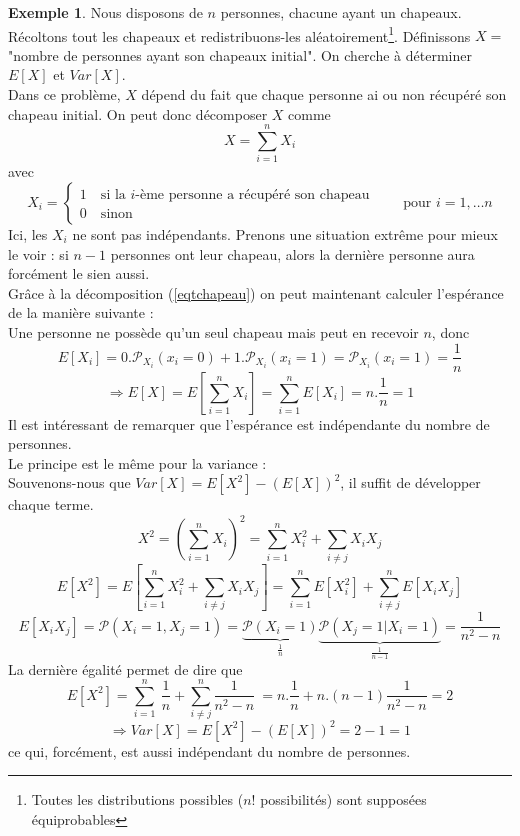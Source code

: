 \documentclass[a4paper,12pt]{report}
\theoremstyle{definition}
\renewcommand{\(}{\left(}
\renewcommand{\)}{\right)}
\renewcommand{\P}{\mathcal{P}}
\renewcommand{\t}{\text}
\newtheorem{exmp}[thm]{Exemple}
\begin{document}
            \begin{exmp}
                Nous disposons de $n$ personnes, chacune ayant un chapeaux. Récoltons tout les chapeaux et redistribuons-les aléatoirement\footnote{Toutes les distributions possibles ($n!$ possibilités) sont supposées équiprobables}. Définissons $X=$"nombre de personnes ayant son chapeaux initial". On cherche à déterminer $E[X]$ et $Var[X]$.\\
        
                Dans ce problème, $X$ dépend du fait que chaque personne ai ou non récupéré son chapeau initial. On peut donc décomposer $X$ comme
                \begin{equation}
                    X=\sum_{i=1}^n X_i
                    \label{eqtchapeau}
                \end{equation}
                avec
                $$X_i = \begin{cases}
                1 \quad \t{si la $i$-ème personne a récupéré son chapeau}\\
                0 \quad \t{sinon}
                \end{cases}\qquad \t{pour } i=1,\dots n$$
                Ici, les $X_i$ ne sont pas indépendants. Prenons une situation extrême pour mieux le voir : si $n-1$ personnes ont leur chapeau, alors la dernière personne aura forcément le sien aussi.\\
        
                Grâce à la décomposition (\ref{eqtchapeau}) on peut maintenant calculer l'espérance de la manière suivante :\\
                Une personne ne possède qu'un seul chapeau mais peut en recevoir $n$, donc
                $$E[X_i] = 0.\P_{X_i}(x_i=0)+1.\P_{X_i}(x_i=1) = \P_{X_i}(x_i=1) = \frac{1}{n}$$
                $$\Rightarrow E[X] =E\left[ \sum_{i=1}^n X_i\right] = \sum_{i=1}^n E[X_i] = n.\frac{1}{n} = 1$$
                Il est intéressant de remarquer que l'espérance est indépendante du nombre de personnes.\\
                
                Le principe est le même pour la variance :\\
                Souvenons-nous que $Var[X] = E[X^2]-(E[X])^2$, il suffit de développer chaque terme.
                $$X^2 = \left( \sum_{i=1}^n X_i \right)^2 = \sum_{i =1}^n X_i^2 + \sum_{i \neq j} X_iX_j$$
                $$E[X^2]=E\left[ \sum_{i=1}^n X_i^2 + \sum_{i\neq j} X_iX_j \right] = \sum_{i=1}^n E[X_i^2] + \sum_{i\neq j}^n E[X_iX_j]$$
                $$E[X_iX_j] = \P(X_i=1,X_j=1) = \underbrace{\P(X_i=1)}_{\frac{1}{n}}\underbrace{\P(X_j=1|X_i=1)}_{\frac{1}{n-1}} = \frac{1}{n^2-n}$$
                La dernière égalité permet de dire que $$E[X^2] = \sum_{i=1}^n~\frac{1}{n}+\sum_{i\neq j}^n\frac{1}{n^2-n}~= n.\frac{1}{n}+n.(n-1)\frac{1}{n^2-n} = 2$$
                $$\Rightarrow Var[X] = E[X^2]-(E[X])^2 = 2 - 1 = 1$$
                ce qui, forcément, est aussi indépendant du nombre de personnes.
            \end{exmp}
        
\end{document}
